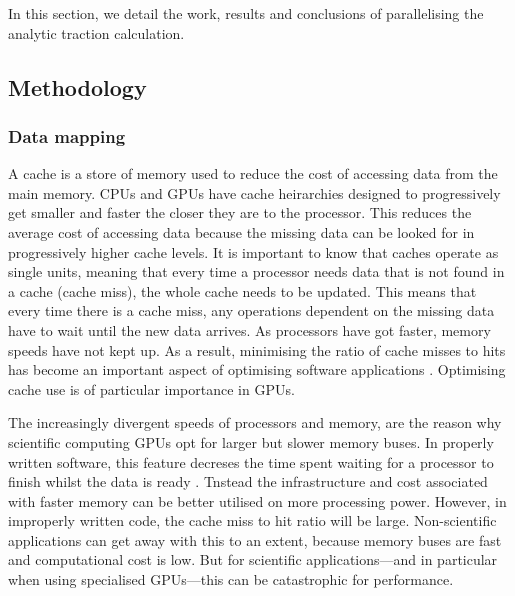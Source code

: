 In this section, we detail the work, results and conclusions of parallelising the analytic traction calculation.

\subsection{Methodology}

\subsubsection{Data mapping}

A cache is a store of memory used to reduce the cost of accessing data from the main memory. CPUs and GPUs have cache heirarchies designed to progressively get smaller and faster the closer they are to the processor. This reduces the average cost of accessing data because the missing data can be looked for in progressively higher cache levels. It is important to know that caches operate as single units, meaning that every time a processor needs data that is not found in a cache (cache miss), the whole cache needs to be updated. This means that every time there is a cache miss, any operations dependent on the missing data have to wait until the new data arrives. As processors have got faster, memory speeds have not kept up. As a result, minimising the ratio of cache misses to hits has become an important aspect of optimising software applications \cite{cpuMemDiv,gpuMemDiv}. Optimising cache use is of particular importance in GPUs.

The increasingly divergent speeds of processors and memory, are the reason why scientific computing GPUs opt for larger but slower memory buses. In properly written software, this feature decreses the time spent waiting for a processor to finish whilst the data is ready \cite{gpuCache,sharedCache,gpuMemDiv2}. Tnstead the infrastructure and cost associated with faster memory can be better utilised on more processing power. However, in improperly written code, the cache miss to hit ratio will be large. Non-scientific applications can get away with this to an extent, because memory buses are fast and computational cost is low. But for scientific applications---and in particular when using specialised GPUs---this can be catastrophic for performance.

